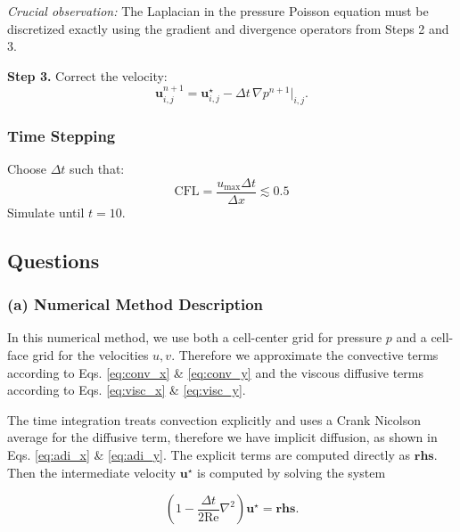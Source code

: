 \emph{Crucial observation:} The Laplacian in the pressure Poisson equation must be discretized exactly using the gradient and divergence operators from Steps 2 and 3.

\textbf{Step 3.} Correct the velocity:
\begin{equation}
  \mathbf{u}^{n+1}_{i,j} = \mathbf{u}^\star_{i,j} - \Delta t\,\nabla p^{n+1}\big|_{i,j}. \label{eq:correction}
\end{equation}

\subsubsection*{Time Stepping}

Choose $\Delta t$ such that:
\[
  \mathrm{CFL} = \frac{u_{\max}\Delta t}{\Delta x} \lesssim 0.5
\]
Simulate until $t = 10$.

\subsection*{Questions}

\subsubsection*{(a) Numerical Method Description}


In this numerical method, we use both a cell-center grid for pressure $p$ and a cell-face grid for the velocities $u,v$. Therefore we approximate the convective terms according to Eqs. \eqref{eq:conv_x} \& \eqref{eq:conv_y} and the viscous diffusive terms according to Eqs. \eqref{eq:visc_x} \& \eqref{eq:visc_y}.

The time integration treats convection explicitly and uses a Crank Nicolson average for the diffusive term, therefore we have implicit diffusion, as shown in Eqs. \eqref{eq:adi_x} \& \eqref{eq:adi_y}. The explicit terms are computed directly as $\mathbf{rhs}$. Then the intermediate velocity $\mathbf{u}^\star$ is computed by solving the system 

\begin{equation}
  \left ( 1 - \frac{\Delta t}{2 \text{Re}} \nabla^2 \right ) \mathbf{u}^\star = \mathbf{rhs}.
\end{equation}

